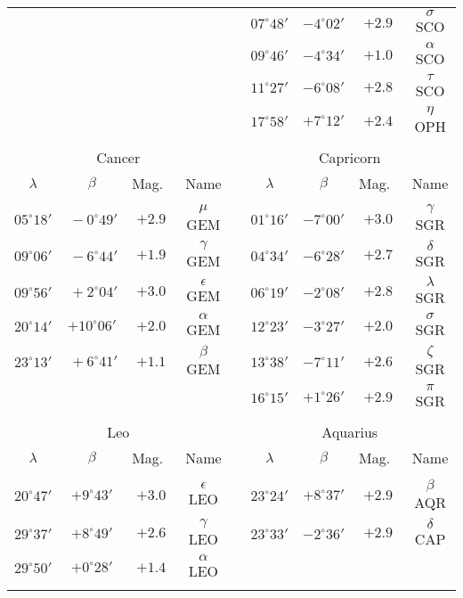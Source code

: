 \begin{table}
{\begin{tabular}{ccccccccc}
&&&&&
$07^\circ 48'$ &  $-4^\circ 02'$ &  $+2.9$ &  $\sigma$   SCO\\
&&&&&
$09^\circ 46'$ &   $-4^\circ 34'$ &  $+1.0$ &   $\alpha$   SCO\\
&&&&&
$11^\circ 27'$ &   $-6^\circ 08'$ &   $+2.8$ &  $\tau$     SCO\\
&&&&&
$17^\circ 58'$ &  $+7^\circ 12'$ &  $+2.4$ &  $\eta$     OPH\\
\multicolumn{8}{c}{}\\
\multicolumn{4}{c}{Cancer} && \multicolumn{4}{c}{Capricorn}\\
$\lambda$ & $\beta$ & Mag.\ & Name  && $\lambda$ & $\beta$ & Mag.\ & Name \\\cline{1-4}\cline{6-9}
&&&&&&&&\\[-1.75ex]
$05^\circ 18'$ &   $~-0^\circ 49'$ &  $+2.9$ &  $\mu$      GEM &&
$01^\circ 16'$ &  $-7^\circ 00'$ &   $+3.0$ & $\gamma$   SGR\\
$09^\circ 06'$ &  $~-6^\circ 44'$ &  $+1.9$ &  $\gamma$   GEM &&
$04^\circ 34'$ &  $-6^\circ 28'$ &  $+2.7$  & $\delta$   SGR\\
$09^\circ 56'$ &  $~+2^\circ 04'$ &  $+3.0$ &  $\epsilon$ GEM &&
$06^\circ 19'$ &  $-2^\circ 08'$ &  $+2.8$ &   $\lambda$  SGR\\
$20^\circ 14'$ & $+10^\circ 06'$ & $+2.0$ & $\alpha$ GEM &&
$12^\circ 23'$ &  $-3^\circ 27'$ &  $+2.0$  & $\sigma$   SGR\\
$23^\circ 13'$ &  $~+6^\circ 41'$ &  $+1.1$ &  $\beta$    GEM &&
$13^\circ 38'$ &   $-7^\circ 11'$ &  $+2.6$ &  $\zeta$    SGR \\
&&&&&
$16^\circ 15'$  & $+1^\circ 26'$ &  $+2.9$ &  $\pi$      SGR\\
\multicolumn{8}{c}{}\\
\multicolumn{4}{c}{Leo} && \multicolumn{4}{c}{Aquarius}\\
$\lambda$ & $\beta$ & Mag.\ & Name  && $\lambda$ & $\beta$ & Mag.\ & Name \\\cline{1-4}\cline{6-9}
&&&&&&&&\\[-1.75ex]
$20^\circ 47'$ &  $+9^\circ 43'$ &  $+3.0$ &   $\epsilon$ LEO &&
$23^\circ 24'$ &   $+8^\circ 37'$ &   $+2.9$ &   $\beta$    AQR\\
$29^\circ 37'$ &  $+8^\circ 49'$ &  $+2.6$ &  $\gamma$  LEO &&
$23^\circ 33'$ &  $-2^\circ 36'$ &  $+2.9$ &  $\delta$   CAP\\
$29^\circ 50'$ &  $+0^\circ 28'$ &  $+1.4$ &  $\alpha$   LEO &&
&&&\\
\multicolumn{8}{c}{}\\

\end{tabular}}
\end{table}
